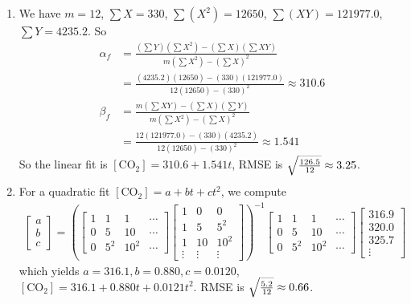 \begin{Answer}
\begin{enumerate}[label=(\alph*)]
\item We have $m=12$, $\sum X=330$, $\sum (X^2)=12650$, $\sum (XY)=121977.0$, $\sum Y=4235.2$. So
\begin{align*}
\alpha_f &= \frac{(\sum Y) (\sum X^2) - (\sum X) (\sum XY)}{m(\sum X^2) - (\sum X)^2} \\
&= \frac{(4235.2) (12650) - (330) (121977.0)}{12(12650) - (330)^2} \approx 310.6 \\
\beta_f &= \frac{m (\sum XY) - (\sum X) (\sum Y)}{m(\sum X^2) - (\sum X)^2} \\
&= \frac{12 (121977.0) - (330) (4235.2)}{12(12650) - (330)^2} \approx 1.541
\end{align*}
So the linear fit is $[\text{CO}_2] = 310.6 + 1.541t$, RMSE is $\smash{\sqrt{\frac{126.5}{12}}} \approx 3.25$.
\item For a quadratic fit $[\text{CO}_2] = a + bt + ct^2$, we compute
\begin{align*}
\begin{bmatrix}
a\\
b\\
c  
\end{bmatrix}
=
\left(
\begin{bmatrix}
1 & 1 & 1 & \cdots \\
0 & 5 & 10 & \cdots \\
0 & 5^2 & 10^2 & \cdots
\end{bmatrix}
\begin{bmatrix}
1 & 0 & 0\\
1 & 5 & 5^2\\
1 & 10 & 10^2\\
\vdots & \vdots & \vdots
\end{bmatrix}\right)^{-1}
\begin{bmatrix}
1 & 1 & 1 & \cdots \\
0 & 5 & 10 & \cdots \\
0 & 5^2 & 10^2 & \cdots
\end{bmatrix}
\begin{bmatrix}
316.9\\
320.0\\
325.7\\
\vdots
\end{bmatrix}
\end{align*}
which yields $a = 316.1, b = 0.880, c= 0.0120$, $[\text{CO}_2] = 316.1 + 0.880t + 0.0121t^2$. RMSE is $\smash{\sqrt{\frac{5.2}{12}}} \approx 0.66$.
\end{enumerate}
\end{Answer}

